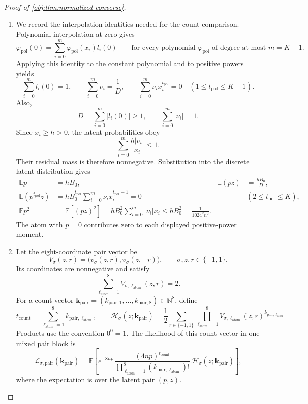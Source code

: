 \begin{proof}[Proof of \cref{obj:thm:normalized-converse}]
\begin{enumerate}
\item
We record the interpolation identities needed for the count comparison. Polynomial interpolation at zero gives
\[
\varphi_{\mathrm{pol}}(0)
=\sum_{i=0}^{m}\varphi_{\mathrm{pol}}(x_i)l_i(0)
\qquad
\text{for every polynomial \(\varphi_{\mathrm{pol}}\) of degree at most \(m=K-1\)}.
\]
Applying this identity to the constant polynomial and to positive powers yields
\[
\sum_{i=0}^{m}l_i(0)=1,
\qquad
\sum_{i=0}^{m}\nu_i=\frac1D,
\qquad
\sum_{i=0}^{m}\nu_i x_i^{t_{\mathrm{pol}}}=0
\quad(1\le t_{\mathrm{pol}}\le K-1).
\]
Also,
\[
D=\sum_{i=0}^{m}|l_i(0)|\ge1,
\qquad
\sum_{i=0}^{m}|\nu_i|=1.
\]
Since \(x_i\ge h>0\), the latent probabilities obey
\[
\sum_{i=0}^{m}\frac{h|\nu_i|}{x_i}\le1.
\]
Their residual mass is therefore nonnegative. Substitution into the discrete latent distribution gives
\[
\begin{aligned}
\mathbb E p&=hB_0,
&
\mathbb E(pz)&=\frac{hB_0}{D},\\
\mathbb E(p^{t_{\mathrm{pol}}}z)
&=hB_0^{t_{\mathrm{pol}}}
  \sum_{i=0}^{m}\nu_i x_i^{t_{\mathrm{pol}}-1}
 =0
&& (2\le t_{\mathrm{pol}}\le K),\\
\mathbb E p^2
&=\mathbb E[(pz)^2]
 =hB_0^2\sum_{i=0}^{m}|\nu_i|x_i
 \le hB_0^2
 =\frac1{1024^2n^2}.
\end{aligned}
\]
The atom with \(p=0\) contributes zero to each displayed positive-power moment.

\item
Let the eight-coordinate pair vector be
\[
V_\sigma(z,r)
=\bigl(v_\sigma(z,r),v_\sigma(z,-r)\bigr),
\qquad
\sigma,z,r\in\{-1,1\}.
\]
Its coordinates are nonnegative and satisfy
\[
\sum_{\ell_{\mathrm{atom}}=1}^{8}
V_{\sigma,\ell_{\mathrm{atom}}}(z,r)=2.
\]
For a count vector
\(\boldsymbol{k}_{\mathrm{pair}}
=(k_{\mathrm{pair},1},\ldots,k_{\mathrm{pair},8})\in\mathbb N^8\),
define
\[
t_{\mathrm{count}}
=\sum_{\ell_{\mathrm{atom}}=1}^{8}k_{\mathrm{pair},\ell_{\mathrm{atom}}},
\qquad
\mathcal H_\sigma(z;\boldsymbol{k}_{\mathrm{pair}})
=\frac12\sum_{r\in\{-1,1\}}
 \prod_{\ell_{\mathrm{atom}}=1}^{8}
 V_{\sigma,\ell_{\mathrm{atom}}}(z,r)^{
 k_{\mathrm{pair},\ell_{\mathrm{atom}}}}
\]
Products use the convention \(0^0=1\). The likelihood of this count vector in one mixed pair block is
\[
\mathcal L_{\sigma,\mathrm{pair}}
(\boldsymbol{k}_{\mathrm{pair}})
=
\mathbb E\!\left[
e^{-8np}\,
\frac{(4np)^{t_{\mathrm{count}}}}
     {\prod_{\ell_{\mathrm{atom}}=1}^{8}
       (k_{\mathrm{pair},\ell_{\mathrm{atom}}})!}
\,
\mathcal H_\sigma(z;\boldsymbol{k}_{\mathrm{pair}})
\right],
\]
where the expectation is over the latent pair \((p,z)\).


\end{enumerate}
\end{proof}
